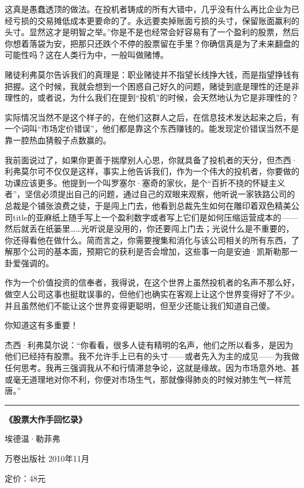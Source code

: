 这真是愚蠢透顶的做法。在投机者铸成的所有大错中，几乎没有什么再比企业为已经亏损的交易摊低成本更要命的了。永远要卖掉账面亏损的头寸，保留账面赢利的头寸。显然这才是明智之举。''你是不是也经常会好容易有了一个盈利的股票，然后你想着落袋为安，把那只还跌个不停的股票留在手里？你确信真是为了未来翻盘的可能性吗？这在人类行为中，一般叫做赌博。

赌徒利弗莫尔告诉我们的真理是：职业赌徒并不指望长线挣大钱，而是指望挣钱有把握。这个时候，我就会想到一个困惑自己好久的问题，赌徒到底是理性的还是非理性的，或者说，为什么我们在提到``投机''的时候，会天然地认为它是非理性的？

实际情况当然不是这个样子的，在他们这群人之后，在信息技术发达起来之后，有一个词叫``市场定价错误''，他们都是靠这个东西赚钱的。能发现定价错误当然不是靠一腔热血猜骰子点数赢的。

我前面说过了，如果你更善于揣摩别人心思，你就具备了投机者的天分，但杰西·利弗莫尔可不仅仅是这样，事实上他告诉我们，作为一个伟大的投机者，你要做的功课应该更多。他提到一个叫罗塞尔·塞奇的家伙，是个``百折不挠的怀疑主义者''，坚信必须提出自己的问题，通过自己的双眼来观察，他听说一家铁路公司的总裁是个铺张浪费之徒，于是闯上门去，他看到总裁先生如何在雕印着双色精美公司title的亚麻纸上随手写上一个盈利数字或者写上它们是如何压缩运营成本的------然后就丢在纸篓里\ldots{}\ldots{}光听说是没用的，你还要闯上门去；光说什么是不重要的，你还得看他在做什么。简而言之，你需要搜集和消化与该公司相关的所有东西，了解那个公司的基本面，预期它的获利是否会增加，这些事一向是安迪·凯斯勒那一卦爱强调的。

作为一个价值投资的信奉者，我得说，在这个世界上虽然投机者的名声不那么好，做空人公司这事也挺耽误事的，但他们也确实在客观上让这个世界变得好了不少。并且虽然他们不能让这个世界变得更聪明，但至少还能让我们知道自己傻。

你知道这有多重要！

杰西·利弗莫尔说：``你看看，很多人徒有精明的名声，他们之所以看多，是因为他们已经持有股票。我不允许手上已有的头寸------或者先入为主的成见------为我做任何思考。我再三强调我从不和行情滞怠争论，这就是缘故。因为市场意外地、甚或毫无道理地对你不利，你便对市场生气，那就像得肺炎的时候对肺生气一样荒唐。''

\begin{center}\rule{3in}{0.4pt}\end{center}

\textbf{《股票大作手回忆录》}

埃德温·勒菲弗

万卷出版社 2010年11月

定价：48元

